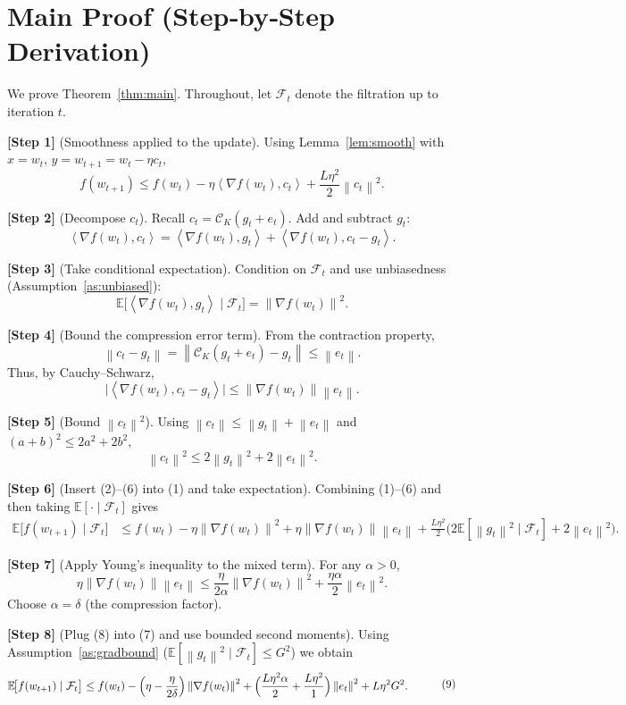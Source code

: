 \documentclass{article}
\newcommand{\E}{\mathbb{E}}
\newcommand{\norm}[1]{\left\lVert #1\right\rVert}
\newcommand{\ip}[2]{\left\langle #1,#2\right\rangle}
\newcommand{\cK}{\mathcal{C}_K}
\begin{document}
\section*{Main Proof (Step‑by‑Step Derivation)}
We prove Theorem~\ref{thm:main}. Throughout, let $\mathcal{F}_t$ denote the filtration up to iteration $t$.

\noindent\textbf{[Step 1]} (Smoothness applied to the update).  
Using Lemma~\ref{lem:smooth} with $x=w_t$, $y=w_{t+1}=w_t-\eta c_t$,
\[
f(w_{t+1})\le f(w_t)-\eta\ip{\nabla f(w_t)}{c_t}+\frac{L\eta^2}{2}\norm{c_t}^2 .
\tag{1}
\]

\noindent\textbf{[Step 2]} (Decompose $c_t$).  
Recall $c_t=\cK(g_t+e_t)$. Add and subtract $g_t$:
\[
\ip{\nabla f(w_t)}{c_t}
= \ip{\nabla f(w_t)}{g_t}
   +\ip{\nabla f(w_t)}{c_t-g_t}.
\tag{2}
\]

\noindent\textbf{[Step 3]} (Take conditional expectation).  
Condition on $\mathcal{F}_t$ and use unbiasedness (Assumption~\ref{as:unbiased}):
\[
\E\!\bigl[\ip{\nabla f(w_t)}{g_t}\mid\mathcal{F}_t\bigr]
= \norm{\nabla f(w_t)}^2 .
\tag{3}
\]

\noindent\textbf{[Step 4]} (Bound the compression error term).  
From the contraction property,
\[
\norm{c_t-g_t}=\norm{\cK(g_t+e_t)-g_t}
\le \norm{e_t} .
\tag{4}
\]
Thus, by Cauchy–Schwarz,
\[
\bigl|\ip{\nabla f(w_t)}{c_t-g_t}\bigr|
\le \norm{\nabla f(w_t)}\norm{e_t}.
\tag{5}
\]

\noindent\textbf{[Step 5]} (Bound $\norm{c_t}^2$).  
Using $\norm{c_t}\le \norm{g_t}+\norm{e_t}$ and $(a+b)^2\le 2a^2+2b^2$,
\[
\norm{c_t}^2\le 2\norm{g_t}^2+2\norm{e_t}^2 .
\tag{6}
\]

\noindent\textbf{[Step 6]} (Insert (2)–(6) into (1) and take expectation).  
Combining (1)–(6) and then taking $\E[\cdot\mid\mathcal{F}_t]$ gives
\[
\begin{aligned}
\E\!\bigl[f(w_{t+1})\mid\mathcal{F}_t\bigr]
&\le f(w_t)-\eta\norm{\nabla f(w_t)}^2
   +\eta \norm{\nabla f(w_t)}\norm{e_t}
   +\frac{L\eta^2}{2}\bigl(2\E[\norm{g_t}^2\mid\mathcal{F}_t]+2\norm{e_t}^2\bigr) .
\end{aligned}
\tag{7}
\]

\noindent\textbf{[Step 7]} (Apply Young’s inequality to the mixed term).  
For any $\alpha>0$,
\[
\eta \norm{\nabla f(w_t)}\norm{e_t}
\le \frac{\eta}{2\alpha}\norm{\nabla f(w_t)}^2
   +\frac{\eta\alpha}{2}\norm{e_t}^2 .
\tag{8}
\]
Choose $\alpha=\delta$ (the compression factor).  

\noindent\textbf{[Step 8]} (Plug (8) into (7) and use bounded second moments).  
Using Assumption~\ref{as:gradbound} ($\E[\norm{g_t}^2\mid\mathcal{F}_t]\le G^2$) we obtain
\[
\begin{aligned}
\E\!\bigl[f(w_{t+1})\mid\mathcal{F}_t\bigr]
\le\;& f(w_t)
-\Bigl(\eta-\frac{\eta}{2\delta}\Bigr)\norm{\nabla f(w_t)}^2
+\Bigl(\frac{L\eta^2\alpha}{2}+\frac{L\eta^2}{1}\Bigr)\norm{e_t}^2
+L\eta^2 G^2 .
\end{aligned}
\tag{9}
\]
\end{document}
